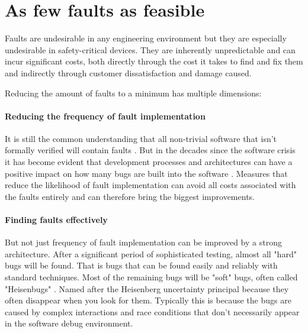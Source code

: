 \section{As few faults as feasible}
Faults are undesirable in any engineering environment but they are especially undesirable in safety-critical devices. They are inherently unpredictable and can incur significant costs, both directly through the cost it takes to find and fix them and indirectly through customer dissatisfaction and damage caused.

Reducing the amount of faults to a minimum has multiple dimensions:
\paragraph{Reducing the frequency of fault implementation}
It is still the common understanding that all non-trivial software that isn't formally verified will contain faults \cite{klein2009sel4}\cite{Lipow.1982}. But in the decades since the software crisis it has become evident that development processes and architectures can have a positive impact on how many bugs are built into the software \cite{Randell.1996}.  Measures that reduce the likelihood of fault implementation can avoid all costs associated with the faults entirely and can therefore bring the biggest improvements. 
\paragraph{Finding faults effectively}
But not just frequency of fault implementation can be improved by a strong architecture. After a significant period of sophisticated testing, almost all "hard" bugs will be found. That is bugs that can be found easily and reliably with standard techniques. Most of the remaining bugs will be "soft" bugs, often called "Heisenbugs" \cite{Gray.1986}. Named after the Heisenberg uncertainty principal because they often disappear when you look for them. Typically this is because the bugs are caused by complex interactions and race conditions that don't necessarily appear in the software debug environment.

